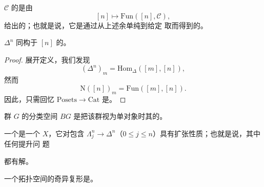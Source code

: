 \begin{definition}\label{def:nerve}
\trCategory{} $\mathcal{C}$ 的\trNerve{}是由
\[
[n] \mapsto \mathrm{Fun}([n], \mathcal{C}),
\]
给出的\trSimplicialSet{}；也就是说，它是通过从上述余单纯\trCategory{}到给定%
\trCategory{}取\trFunctor{}而得到的。
\end{definition}
\begin{lemma}\label{lem:delta-n-nerve}
$\Delta^n$ 同构于\trCategory{} $[n]$ 的\trNerve{}。
\end{lemma}

\begin{proof}
展开定义，我们发现
\[
(\Delta^n)_m = \mathrm{Hom}_{\Delta}([m],[n]),
\]
然而
\[
\mathrm{N}([n])_m = \mathrm{Fun}([m],[n]).
\]
因此，只需回忆\trFunctor{} $\mathrm{Posets} \to \mathrm{Cat}$ 是\trFullyFaithful{}。
\end{proof}

\begin{definition}\label{def:classifying-space}
群 $G$ 的分类空间 $BG$ 是把该群视为单对象\trGroupoid{}时其\trNerve{}的\trGeometricRealization{}。
\end{definition}

\begin{definition}\label{def:kan-complex}
一个\emph{\trKanComplex{}}是一个\trSimplicialSet{} $X$，它对\trHorn{}包含
$\Lambda^n_j \to \Delta^n$（$0 \le j \le n$）具有扩张性质；也就是说，其中任何提升问
题
\begin{center}
\end{center}
都有解。
\end{definition}

\begin{lemma}\label{lem:singular-kan}
一个拓扑空间的奇异复形是\trKanComplex{}。
\end{lemma}

